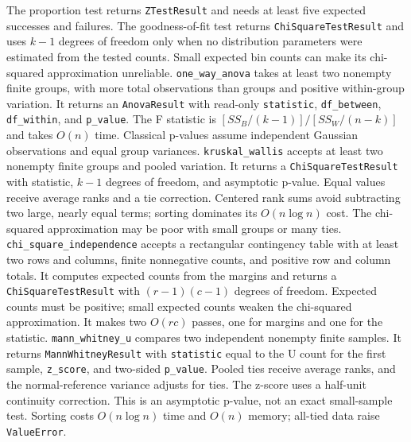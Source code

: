 \documentclass[11pt,a4paper]{article}
\begin{document}
The proportion test returns \verb|ZTestResult| and needs at least five expected successes and failures. The goodness-of-fit test returns \verb|ChiSquareTestResult| and uses $k-1$ degrees of freedom only when no distribution parameters were estimated from the tested counts. Small expected bin counts can make its chi-squared approximation unreliable.
\verb|one_way_anova| takes at least two nonempty finite groups, with more total observations than groups and positive within-group variation. It returns an \verb|AnovaResult| with read-only \verb|statistic|, \verb|df_between|, \verb|df_within|, and \verb|p_value|. The F statistic is $[SS_B/(k-1)]/[SS_W/(n-k)]$ and takes $O(n)$ time. Classical p-values assume independent Gaussian observations and equal group variances.
\verb|kruskal_wallis| accepts at least two nonempty finite groups and pooled variation. It returns a \verb|ChiSquareTestResult| with statistic, $k-1$ degrees of freedom, and asymptotic p-value. Equal values receive average ranks and a tie correction. Centered rank sums avoid subtracting two large, nearly equal terms; sorting dominates its $O(n\log n)$ cost. The chi-squared approximation may be poor with small groups or many ties.
\verb|chi_square_independence| accepts a rectangular contingency table with at least two rows and columns, finite nonnegative counts, and positive row and column totals. It computes expected counts from the margins and returns a \verb|ChiSquareTestResult| with $(r-1)(c-1)$ degrees of freedom. Expected counts must be positive; small expected counts weaken the chi-squared approximation. It makes two $O(rc)$ passes, one for margins and one for the statistic.
\verb|mann_whitney_u| compares two independent nonempty finite samples. It returns \verb|MannWhitneyResult| with \verb|statistic| equal to the U count for the first sample, \verb|z_score|, and two-sided \verb|p_value|. Pooled ties receive average ranks, and the normal-reference variance adjusts for ties. The z-score uses a half-unit continuity correction. This is an asymptotic p-value, not an exact small-sample test. Sorting costs $O(n\log n)$ time and $O(n)$ memory; all-tied data raise \verb|ValueError|.
\end{document}
